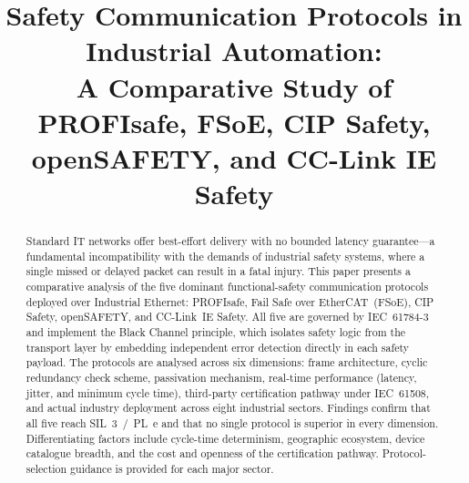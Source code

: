 \documentclass[conference]{IEEEtran}
\begin{document}
\title{Safety Communication Protocols in Industrial Automation:\\
A Comparative Study of PROFIsafe, FSoE, CIP Safety,\\
openSAFETY, and CC-Link IE Safety}

\author{
\and
{}
\and
{}
\and
{}
}

\maketitle

\begin{abstract}
Standard IT networks offer best-effort delivery with no bounded latency
guarantee---a fundamental incompatibility with the demands of industrial
safety systems, where a single missed or delayed packet can result in a
fatal injury. This paper presents a comparative analysis of the five
dominant functional-safety communication protocols deployed over
Industrial Ethernet: PROFIsafe, Fail Safe over EtherCAT~(FSoE),
CIP Safety, openSAFETY, and CC-Link~IE Safety. All five are governed
by IEC~61784-3 and implement the Black Channel principle, which isolates
safety logic from the transport layer by embedding independent error
detection directly in each safety payload. The protocols are analysed
across six dimensions: frame architecture, cyclic redundancy check
scheme, passivation mechanism, real-time performance (latency, jitter,
and minimum cycle time), third-party certification pathway under
IEC~61508, and actual industry deployment across eight industrial sectors.
Findings confirm that all five reach SIL~3~/~PL~e and that no single
protocol is superior in every dimension. Differentiating factors include
cycle-time determinism, geographic ecosystem, device catalogue breadth,
and the cost and openness of the certification pathway.
Protocol-selection guidance is provided for each major sector.
\end{abstract}
\end{document}
